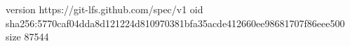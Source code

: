 version https://git-lfs.github.com/spec/v1
oid sha256:5770caf04dda8d121224d810970381bfa35acde412660ee98681707f86eee500
size 87544
